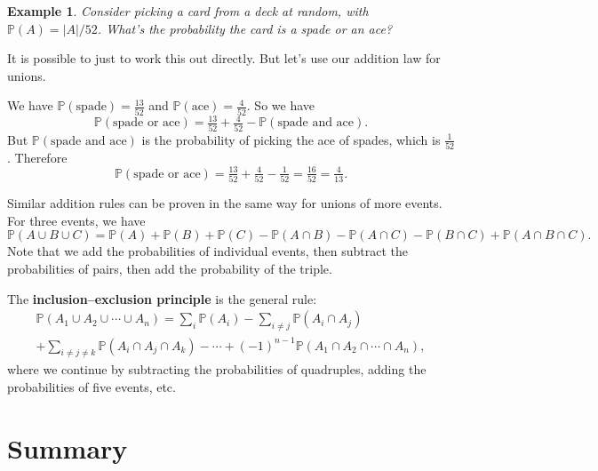 \documentclass[
  a4paper,
]{book}
\theoremstyle{definition}
\theoremstyle{definition}
\newtheorem{example}{Example}[chapter]
\theoremstyle{definition}
\theoremstyle{definition}
\theoremstyle{remark}
\begin{document}
\begin{example}
\emph{Consider picking a card from a deck at random, with \(\mathbb P(A) = |A|/52\). What's the probability the card is a spade or an ace?}

It is possible to just to work this out directly. But let's use our addition law for unions.

We have \(\mathbb P(\text{spade}) = \frac{13}{52}\) and \(\mathbb P(\text{ace}) = \frac{4}{52}\). So we have
\[ \mathbb P(\text{spade or ace}) = \tfrac{13}{52} + \tfrac{4}{52} - \mathbb P(\text{spade and ace}) . \]
But \(\mathbb P(\text{spade and ace})\) is the probability of picking the ace of spades, which is \(\frac{1}{52}\). Therefore
\[ \mathbb P(\text{spade or ace}) = \tfrac{13}{52} + \tfrac{4}{52}  - \tfrac{1}{52} = \tfrac{16}{52} = \tfrac{4}{13} . \]
\end{example}

Similar addition rules can be proven in the same way for unions of more events. For three events, we have
\[
  \mathbb P(A \cup B \cup C) = \mathbb P(A) + \mathbb P(B) + \mathbb P(C) 
  - \mathbb P(A \cap B) - \mathbb P(A \cap C) - \mathbb P(B \cap C) + \mathbb P(A \cap B \cap C) .
\]
Note that we add the probabilities of individual events, then subtract the probabilities of pairs, then add the probability of the triple.

The \textbf{inclusion--exclusion principle} is the general rule:
\begin{multline*} \mathbb P(A_1 \cup A_2 \cup \cdots \cup A_n)
  = \sum_i \mathbb P(A_i)
    - \sum_{i \neq j} \mathbb P(A_i \cap A_j) \\
    + \sum_{i \neq j \neq k} \mathbb P(A_i \cap A_j \cap A_k)
    - \cdots
    + (-1)^{n-1} \mathbb P(A_1 \cap A_2 \cap \cdots \cap A_n) , \end{multline*}
where we continue by subtracting the probabilities of quadruples, adding the probabilities of five events, etc.

\hypertarget{summary-02}{%
\section*{Summary}\label{summary-02}}
\end{document}

